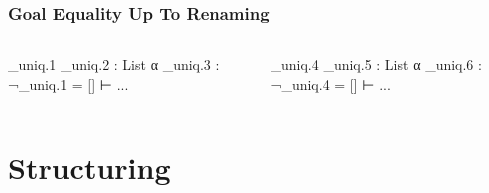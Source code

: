 \begin{frame}[fragile]
  \frametitle{Goal Equality Up To Renaming}

  \begin{columns}[onlytextwidth]
    \begin{column}{.5\textwidth}
      \begin{leancode}
        _uniq.1 _uniq.2 : List α
        _uniq.3 : ¬_uniq.1 = []
        ⊢ ...
      \end{leancode}
    \end{column}
    \begin{column}{.5\textwidth}
      \begin{leancode}
        _uniq.4 _uniq.5 : List α
        _uniq.6 : ¬_uniq.4 = []
        ⊢ ...
      \end{leancode}
    \end{column}
  \end{columns}

  \bigskip

  \begin{center}
  \end{center}
\end{frame}

\section{Structuring}

